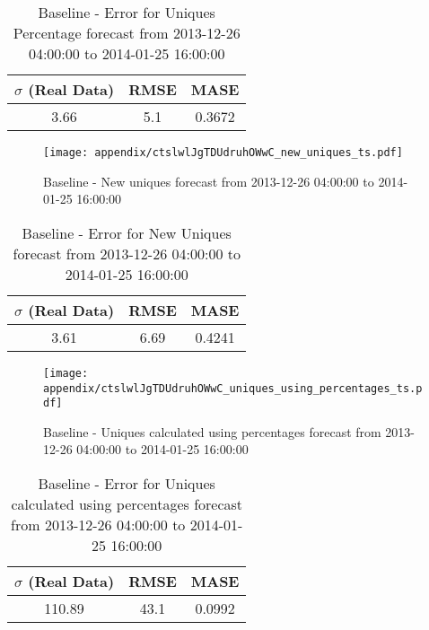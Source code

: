 \begin{table}[H]
\centering
\footnotesize
\begin{tabular}{ccc}
$\sigma$ (Real Data) & RMSE & MASE   \\ \hline
3.66 & 5.1 & 0.3672 \\
\end{tabular}

\vspace{0.5cm}

\caption[]{
Baseline - Error for Uniques Percentage forecast from 2013-12-26 04:00:00 to 2014-01-25 16:00:00}
\end{table}

\begin{figure}[H] \begin{center} \leavevmode
\texttt{[image: appendix/ctslwlJgTDUdruhOWwC\_new\_uniques\_ts.pdf]} \caption[]{
Baseline - New uniques forecast from 2013-12-26 04:00:00 to 2014-01-25 16:00:00} \label{fig:appendix/ctslwlJgTDUdruhOWwC_new_uniques_ts.pdf} \end{center}
\end{figure}

\begin{table}[H]
\centering
\footnotesize
\begin{tabular}{ccc}
$\sigma$ (Real Data) & RMSE & MASE   \\ \hline
3.61 & 6.69 & 0.4241 \\
\end{tabular}

\vspace{0.5cm}

\caption[]{
Baseline - Error for New Uniques forecast from 2013-12-26 04:00:00 to 2014-01-25 16:00:00}
\end{table}

\begin{figure}[H] \begin{center} \leavevmode
\texttt{[image: appendix/ctslwlJgTDUdruhOWwC\_uniques\_using\_percentages\_ts.pdf]} \caption[]{
Baseline - Uniques calculated using percentages forecast from 2013-12-26 04:00:00 to 2014-01-25 16:00:00} \label{fig:appendix/ctslwlJgTDUdruhOWwC_uniques_using_percentages_ts.pdf} \end{center}
\end{figure}

\begin{table}[H]
\centering
\footnotesize
\begin{tabular}{ccc}
$\sigma$ (Real Data) & RMSE & MASE   \\ \hline
110.89 & 43.1 & 0.0992 \\
\end{tabular}

\vspace{0.5cm}

\caption[]{
Baseline - Error for Uniques calculated using percentages forecast from 2013-12-26 04:00:00 to 2014-01-25 16:00:00}
\end{table}

